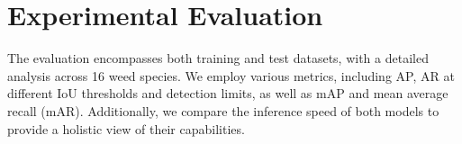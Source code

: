 \section{Experimental Evaluation}

The evaluation encompasses both training and test datasets, with a detailed analysis across 16 weed species. We employ various metrics, including AP, AR at different IoU thresholds and detection limits, as well as mAP and mean average recall (mAR). Additionally, we compare the inference speed of both models to provide a holistic view of their capabilities.




